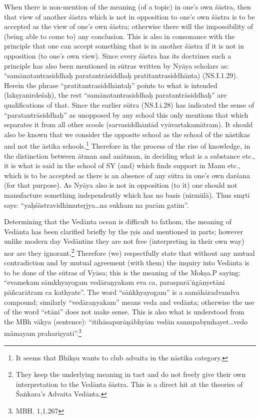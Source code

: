 When there is non-mention of the meaning (of a topic) in one’s own śāstra, then that view of another śāstra which is not in opposition to one’s own śāstra is to be accepted as the view of one’s own śāstra; otherwise there will the impossibility of (being able to come to) any conclusion. This is also in consonance with the principle that one can accept something that is in another śāstra if it is not in opposition (to one’s own view). Since every śāstra has its doctrines such a principle has also been mentioned in sūtras written by Nyāya scholars as: “samānatantrasiddhaḥ paratantrāsiddhaḥ pratitantrasiddhānta) (NS.I.1.29). Herein the phrase “pratitantrasiddhāntaḥ” points to what is intended (lakṣyanirdeśaḥ), the rest “samānatantrasiddhaḥ paratantrāsiddhaḥ” are qualifications of that. Since the earlier sūtra (NS.I.i.28) has indicated the sense of “paratantrāsiddhaḥ” as unopposed by any school this only mentions that which separates it from all other scools (sarvasiddhāntād vyāvartakamātram). It should also be known that we consider the opposite school as the school of the nāstikas and not the āstika schools.\footnote{It seems that Bhikṣu wants to club advaita in the nāstika category.} Therefore in the process of the rise of knowledge, in the distinction between ātman and anātman, in deciding what is a substance etc., it is what is said in the school of SY (and) which finds support in Manu etc., which is to be accepted as there is an absence of any sūtra in one’s own darśana  (for that purpose).  As Nyāya also is not in opposition (to it) one should not manufacture something independently which has no basis (nirmūlā). Thus smṛti says: “yaḥśāstravidhimutsṛjya…na sukham na parām gatim”.  

Determining that the Vedānta ocean is difficult to fathom, the meaning of Vedānta has been clarified briefly by the ṛṣis and mentioned in parts; however unlike modern day Vedāntins they are not free (interpreting in their own way) nor are they ignorant.\footnote{They keep the underlying meaning in tact and do not freely give their own interpretation to the Vedānta śāstra. This is a direct hit at the theories of Śaṅkara’s Advaita Vedānta.} Therefore (we) respectfully state that without any mutual contradiction and by mutual agreement (with them) the inquiry into Vedānta is to be done of the sūtras of Vyāsa; this is the meaning of the Mokṣa.P saying: “evamekam sāmkhyayogam vedāraṇyakam eva ca, parasparā’ṅgānyetāni pāñcarātram ca kathyate”. The word “sāṅkhyayogam” is a samāhāradvan\-dva compound; similarly “vedāraṇyakam” means veda and vedānta; otherwise the use of the word “etāni” does not make sense. This is also what is understood from the MBh vākya (sentence): “itihāsapurāṇābhyām vedān samupabṛmhayet…vedo māmayam prahariṣyati”.\footnote{MBH. 1,1.267}


